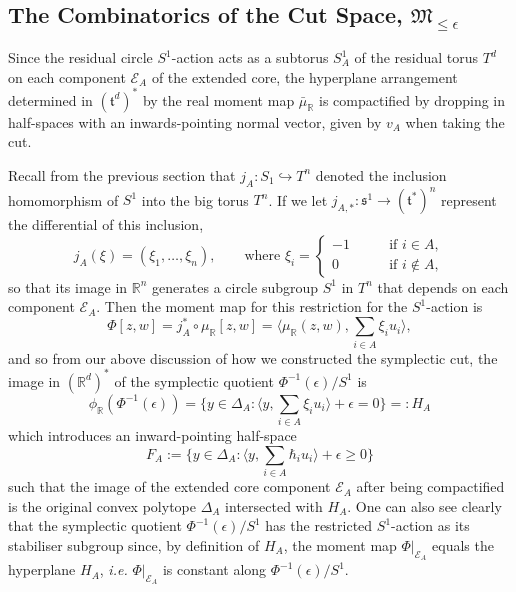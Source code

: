 \documentclass{article}
\newcommand{\st}{\ensuremath{:}}%
\newcommand{\ie}{\emph{i.e.} }
\newcommand{\e}{\epsilon}
\newcommand{\RR}{\mathbb{R}}
\newcommand{\mft}{\mathfrak{t}}
\newcommand{\mc}[1]{\mathcal{#1}}
\newcommand{\mf}[1]{\mathfrak{#1}}
\newcommand{\mrr}{\mu_{\mathbb{R}}}
\newcommand{\prr}{\phi_{\mathbb{R}}}
\begin{document}
	\subsection{The Combinatorics of the Cut Space, $\mf{M}_{\leq \e}$}
	
	Since the residual circle $S^{1}$-action acts as a subtorus $S_{A}^{1}$ of the residual torus $T^{d}$ on each component $\mc{E}_{A}$ of the extended core, the hyperplane arrangement determined in $(\mft^{d})^{\ast}$ by the real moment map $\bar{\mu}_{\RR}$ is compactified by dropping in half-spaces with an inwards-pointing normal vector, given by $v_{A}$ when taking the cut. 
	
	Recall from the previous section that $j_{A}: S_{1} \hookrightarrow T^{n}$ denoted the inclusion homomorphism of $S^{1}$ into the big torus $T^{n}$. If we let $j_{A, \ast}: \mf{s}^{1} \rightarrow (\mft^{\ast})^{n}$ represent the differential of this inclusion,
	\begin{equation*}
		j_{A}( \xi  ) = (\xi_{1},\ldots, \xi_{n}),\qquad \text{where } \xi_{i} = 
		\begin{cases}
			-1\qquad&\text{if } i\in A,\\
			0\qquad &\text{if } i \not\in A,
		\end{cases}
	\end{equation*}
	so that its image in $\RR^{n}$ generates a circle subgroup $S^{1}$ in $T^{n}$ that depends on each component $\mc{E}_{A}$. Then the moment map for this restriction for the $S^{1}$-action is
	\begin{equation*}
		\Phi[z,w] = j_{A}^{\ast} \circ \mrr[z,w] = \bigg\langle \mrr(z,w), \sum_{i\in A}\xi_{i} u_{i} \bigg\rangle,
	\end{equation*}
	and so from our above discussion of how we constructed the symplectic cut, the image in $(\RR^{d})^{\ast}$ of the symplectic quotient $\Phi^{-1}(\e)/S^{1}$ is
	\begin{equation*}
		\prr(\Phi^{-1}(\e)) = \bigg\{ y \in \Delta_{A} \st \bigg\langle y, \sum_{i\in A}\xi_{i}u_{i}\bigg\rangle + \e = 0 \bigg\} =: H_{A}
	\end{equation*}
	which introduces an inward-pointing half-space
	\begin{equation*}
		F_{A} := \bigg\{ y \in \Delta_{A} \st \bigg\langle y, \sum_{i\in A}\hbar_{i}u_{i}\bigg\rangle + \e \geq 0 \bigg\}
	\end{equation*}
	such that the image of the extended core component $\mc{E}_{A}$ after being compactified is the original convex polytope $\Delta_{A}$ intersected with $H_{A}$. One can also see clearly that the symplectic quotient $\Phi^{-1}(\e)/S^{1}$ has the restricted $S^{1}$-action as its stabiliser subgroup since, by definition of $H_{A}$, the moment map $\Phi|_{\mc{E}_{A}}$ equals the hyperplane $H_{A}$, \ie $\Phi|_{\mc{E}_{A}}$ is constant along $\Phi^{-1}(\epsilon)/S^{1}$.
	
\end{document}
